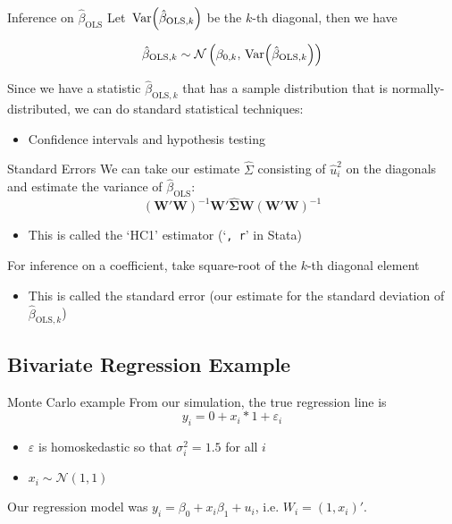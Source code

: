 \documentclass[aspectratio=169,t,11pt,table]{beamer}
\begin{document}
\begin{frame}{Inference on $\hat{\beta}_{\text{OLS}}$}
  Let $\var{\hat{\beta}_{\text{OLS}, k}}$ be the $k$-th diagonal, then we have 

  $$
    \hat{\beta}_{\text{OLS}, k} \sim 
    \mathcal{N}\left( \beta_{0,k}, \var{\hat{\beta}_{\text{OLS}, k}} \right)
  $$

  \bigskip
  Since we have a statistic $\hat{\beta}_{\text{OLS}, k}$ that has a sample distribution that is normally-distributed, we can do standard statistical techniques: 
  \begin{itemize}
    \item Confidence intervals and hypothesis testing
  \end{itemize}
\end{frame}

\begin{frame}{Standard Errors}
  We can take our estimate $\hat{\Sigma}$ consisting of $\hat{u}_i^2$ on the diagonals and estimate the variance of $\hat{\beta}_{\text{OLS}}$:
  $$
    \left(\bm{W}' \bm{W} \right)^{-1} \bm{W}' \hat{\bm{\Sigma}} \bm{W} \left(\bm{W}' \bm{W} \right)^{-1}
  $$

  \begin{itemize}
    \item This is called the `HC1' estimator (`\texttt{, r}' in Stata)
  \end{itemize}

  \pause
  \bigskip
  For inference on a coefficient, take square-root of the $k$-th diagonal element
  \begin{itemize}
    \item This is called the \alert{standard error} (our estimate for the standard deviation of $\hat{\beta}_{\text{OLS}, k}$)
  \end{itemize}
\end{frame}

\subsection{Bivariate Regression Example}

\begin{frame}{Monte Carlo example}
  From our simulation, the true regression line is 
  $$
      y_i = 0 + x_i * 1 + \varepsilon_i
  $$
  \begin{itemize}
    \item $\varepsilon$ is \alert{homoskedastic} so that $\sigma_i^2 = 1.5$ for all $i$
    \item $x_i \sim \mathcal{N}(1, 1)$
  \end{itemize}

  \bigskip
  Our regression model was $y_i = \beta_0 + x_i \beta_1 + u_i$, i.e. $W_i = (1, x_i)'$.
\end{frame}
\end{document}
